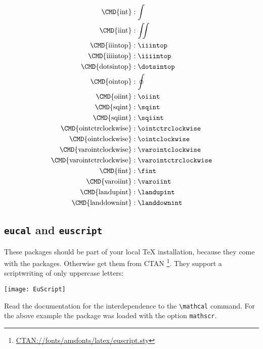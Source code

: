 \begin{table}[htb]
\allowdisplaybreaks
\begin{align}
\text{\CMD{int}}      &: \int\\
\text{\CMD{iint}}     &: \iint\\
\text{\CMD{iiintop}}  &: \iiintop\\
\text{\CMD{iiiintop}} &: \iiiintop\\
\text{\CMD{dotsintop}}&: \dotsintop\\
\text{\CMD{ointop}}   &: \ointop\\
\text{\CMD{oiint}}    &: \oiint\\
\text{\CMD{sqint}}    &: \sqint\\
\text{\CMD{sqiint}}   &: \sqiint\\
\text{\CMD{ointctrclockwise}}    &: \ointctrclockwise\\
\text{\CMD{ointclockwise}}       &: \ointclockwise\\
\text{\CMD{varointclockwise}}    &: \varointclockwise\\
\text{\CMD{varointctrclockwise}} &: \varointctrclockwise\\
\text{\CMD{fint}}        &: \fint\\
\text{\CMD{varoiint}}    &: \varoiint\\
\text{\CMD{landupint}}   &: \landupint\\
\text{\CMD{landdownint}} &: \landdownint
\end{align}


\subsection{\texttt{eucal} and \texttt{euscript}}\label{sec:euscript.sty}

These packages should be part of your local \TeX{} installation, because
they come with the \AmSmath packages. Otherwise get them from CTAN%
\footnote{\href{http://www.ctan.org/tex-archive/fonts/amsfonts/latex/euscript.sty}%
{CTAN://fonts/amsfonts/latex/euscript.sty}}. They support a scriptwriting of only uppercase
letters:

\begin{center}
\texttt{[image: EuScript]}
\end{center}

Read the documentation for the interdependence to the    %
\verb|\mathcal| command. For the above example the
package  was loaded with the option \verb|mathscr|.



\end{table}
